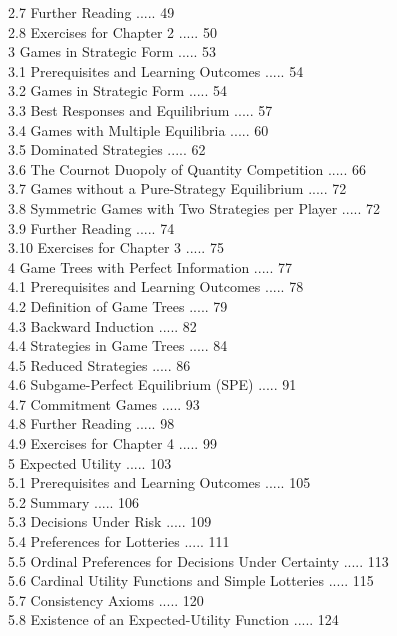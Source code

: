 \documentclass[12pt]{article}
\begin{document}
2.7 Further Reading ..... 49\\
2.8 Exercises for Chapter 2 ..... 50\\
3 Games in Strategic Form ..... 53\\
3.1 Prerequisites and Learning Outcomes ..... 54\\
3.2 Games in Strategic Form ..... 54\\
3.3 Best Responses and Equilibrium ..... 57\\
3.4 Games with Multiple Equilibria ..... 60\\
3.5 Dominated Strategies ..... 62\\
3.6 The Cournot Duopoly of Quantity Competition ..... 66\\
3.7 Games without a Pure-Strategy Equilibrium ..... 72\\
3.8 Symmetric Games with Two Strategies per Player ..... 72\\
3.9 Further Reading ..... 74\\
3.10 Exercises for Chapter 3 ..... 75\\
4 Game Trees with Perfect Information ..... 77\\
4.1 Prerequisites and Learning Outcomes ..... 78\\
4.2 Definition of Game Trees ..... 79\\
4.3 Backward Induction ..... 82\\
4.4 Strategies in Game Trees ..... 84\\
4.5 Reduced Strategies ..... 86\\
4.6 Subgame-Perfect Equilibrium (SPE) ..... 91\\
4.7 Commitment Games ..... 93\\
4.8 Further Reading ..... 98\\
4.9 Exercises for Chapter 4 ..... 99\\
5 Expected Utility ..... 103\\
5.1 Prerequisites and Learning Outcomes ..... 105\\
5.2 Summary ..... 106\\
5.3 Decisions Under Risk ..... 109\\
5.4 Preferences for Lotteries ..... 111\\
5.5 Ordinal Preferences for Decisions Under Certainty ..... 113\\
5.6 Cardinal Utility Functions and Simple Lotteries ..... 115\\
5.7 Consistency Axioms ..... 120\\
5.8 Existence of an Expected-Utility Function ..... 124\\
\end{document}
